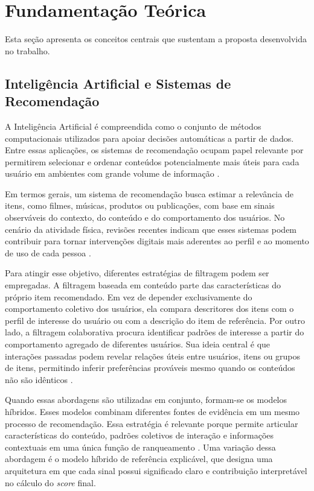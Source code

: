 \documentclass[a4paper,12pt]{article}
\begin{document}
\section{Fundamentação Teórica}

Esta seção apresenta os conceitos centrais que sustentam a proposta desenvolvida no trabalho. 

\subsection{Inteligência Artificial e Sistemas de Recomendação}


A Inteligência Artificial é compreendida como o conjunto de métodos computacionais utilizados para apoiar decisões automáticas a partir de dados. Entre essas aplicações, os sistemas de recomendação ocupam papel relevante por permitirem selecionar e ordenar conteúdos potencialmente mais úteis para cada usuário em ambientes com grande volume de informação \cite{10.1145/3285029,GomezUribe2016Netflix}.

Em termos gerais, um sistema de recomendação busca estimar a relevância de itens, como filmes, músicas, produtos ou publicações, com base em sinais observáveis do contexto, do conteúdo e do comportamento dos usuários. No cenário da atividade física, revisões recentes indicam que esses sistemas podem contribuir para tornar intervenções digitais mais aderentes ao perfil e ao momento de uso de cada pessoa \cite{Venka2022CARS,Agans2025PARecommender}.

Para atingir esse objetivo, diferentes estratégias de filtragem podem ser empregadas. A filtragem baseada em conteúdo parte das características do próprio item recomendado. Em vez de depender exclusivamente do comportamento coletivo dos usuários, ela compara descritores dos itens com o perfil de interesse do usuário ou com a descrição do item de referência. Por outro lado, a filtragem colaborativa procura identificar padrões de interesse a partir do comportamento agregado de diferentes usuários. Sua ideia central é que interações passadas podem revelar relações úteis entre usuários, itens ou grupos de itens, permitindo inferir preferências prováveis mesmo quando os conteúdos não são idênticos \cite{10.1145/3285029}.

Quando essas abordagens são utilizadas em conjunto, formam-se os modelos híbridos. Esses modelos combinam diferentes fontes de evidência em um mesmo processo de recomendação. Essa estratégia é relevante porque permite articular características do conteúdo, padrões coletivos de interação e informações contextuais em uma única função de ranqueamento \cite{Venka2022CARS}. Uma variação dessa abordagem é o modelo híbrido de referência explicável, que designa uma arquitetura em que cada sinal possui significado claro e contribuição interpretável no cálculo do \textit{score} final.
\end{document}
